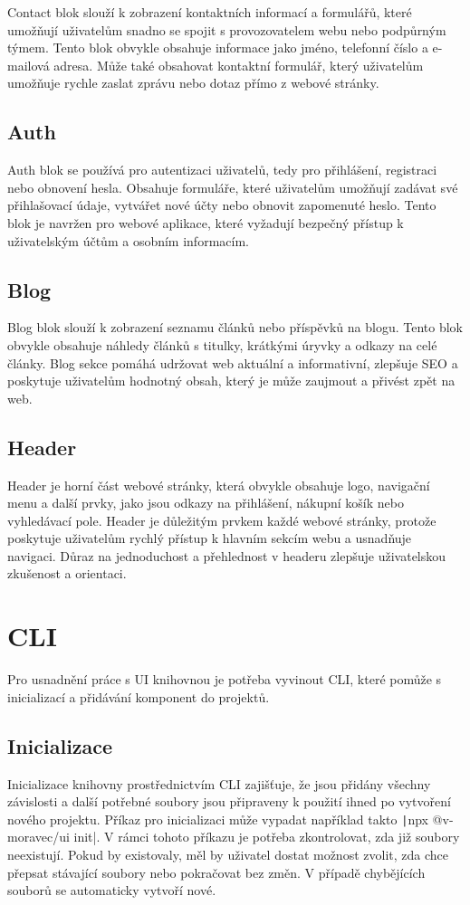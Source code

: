 Contact blok slouží k zobrazení kontaktních informací a formulářů, které umožňují uživatelům snadno se spojit s provozovatelem webu nebo podpůrným týmem. Tento blok obvykle obsahuje informace jako jméno, telefonní číslo a e-mailová adresa. Může také obsahovat kontaktní formulář, který uživatelům umožňuje rychle zaslat zprávu nebo dotaz přímo z webové stránky.

\subsection{Auth}

Auth blok se používá pro autentizaci uživatelů, tedy pro přihlášení, registraci nebo obnovení hesla. Obsahuje formuláře, které uživatelům umožňují zadávat své přihlašovací údaje, vytvářet nové účty nebo obnovit zapomenuté heslo. Tento blok je navržen pro webové aplikace, které vyžadují bezpečný přístup k uživatelským účtům a osobním informacím.

\subsection{Blog}

Blog blok slouží k zobrazení seznamu článků nebo příspěvků na blogu. Tento blok obvykle obsahuje náhledy článků s titulky, krátkými úryvky a odkazy na celé články. Blog sekce pomáhá udržovat web aktuální a informativní, zlepšuje SEO a poskytuje uživatelům hodnotný obsah, který je může zaujmout a přivést zpět na web.

\subsection{Header}

Header je horní část webové stránky, která obvykle obsahuje logo, navigační menu a další prvky, jako jsou odkazy na přihlášení, nákupní košík nebo vyhledávací pole. Header je důležitým prvkem každé webové stránky, protože poskytuje uživatelům rychlý přístup k hlavním sekcím webu a usnadňuje navigaci. Důraz na jednoduchost a přehlednost v headeru zlepšuje uživatelskou zkušenost a orientaci.

\section{CLI}
Pro usnadnění práce s UI knihovnou je potřeba vyvinout CLI, které pomůže s inicializací a přidávání komponent do projektů.

\subsection{Inicializace}
Inicializace knihovny prostřednictvím CLI zajišťuje, že jsou přidány všechny závislosti a další potřebné soubory jsou připraveny k použití ihned po vytvoření nového projektu. Příkaz pro inicializaci může vypadat například takto \texttt|npx @v-moravec/ui init|. V rámci tohoto příkazu je potřeba zkontrolovat, zda již soubory neexistují. Pokud by existovaly, měl by uživatel dostat možnost zvolit, zda chce přepsat stávající soubory nebo pokračovat bez změn. V případě chybějících souborů se automaticky vytvoří nové.

